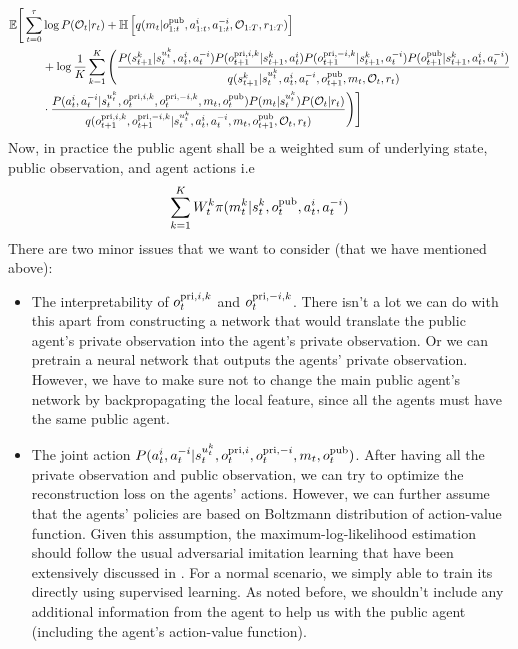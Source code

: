 \begin{equation}
\begin{aligned}
\label{eqn:chap5-elbo-public-agent}
    \mathbb{E}\Bigg[\sum^\tau_{t=0} &\log P(\mathcal{O}_t | r_t) + \mathbb{H}\left[ q(m_t | o^{\operatorname{pub}}_{1:t}, a^{i}_{1:t}, a^{-i}_{1:t}, \mathcal{O}_{1:T}, r_{1:T}) \right] \\
    &+ \log \frac{1}{K} \sum ^K_{k=1}\Bigg(\frac{P(s_{t+1}^k | s_t^{u^k_t}, a_t^i, a_t^{-i})P(o^{\operatorname{pri}, i, k}_{t+1} | s_{t+1}^k, a^i_t) P(o^{\operatorname{pri}, -i, k}_{t+1} | s_{t+1}^k, a^{-i}_t) P(o^{\operatorname{pub}}_{t+1} | s_{t+1}^k, a^i_t, a^{-i}_t)}{q(s_{t+1}^k | s_t^{u^k_t}, a^i_t, a^{-i}_t, o^{\operatorname{pub}}_{t+1}, m_t, \mathcal{O}_t, r_t)} \\
    &\cdot \frac{P(a^i_t, a^{-i}_t | s_t^{u^k_t}, o^{\operatorname{pri}, i, k}_t, o^{\operatorname{pri}, -i, k}_t, m_t, o^{\operatorname{pub}}_t) P(m_t | s_t^{u^k_t}) P(\mathcal{O}_t | r_t)}{q(o^{\operatorname{pri}, i, k}_{t+1}, o^{\operatorname{pri}, -i, k}_{t+1} | s_t^{u^k_t}, a^i_t, a^{-i}_t, m_t, o^{\operatorname{pub}}_{t+1}, \mathcal{O}_t, r_t)} \Bigg)\Bigg]
\end{aligned}
\end{equation}
Now, in practice the public agent shall be a weighted sum of underlying state, public observation, and agent actions i.e
\begin{equation}
    \sum^K_{k=1} W^k_t \pi(m^k_t | s^k_t, o^{\operatorname{pub}}_t, a^i_t, a^{-i}_t)
\end{equation}
There are two minor issues that we want to consider (that we have mentioned above):
\begin{itemize}
    \item The interpretability of $o^{\operatorname{pri}, i, k}_t$ and $o^{\operatorname{pri}, -i, k}_t$. There isn't a lot we can do with this apart from constructing a network that would translate the public agent's private observation into the agent's private observation. Or we can pretrain a neural network that outputs the agents' private observation. However, we have to make sure not to change the main public agent's network by backpropagating the local feature, since all the agents must have the same public agent.
    \item The joint action $P(a^i_t, a^{-i}_t | s_t^{u^k_t}, o^{\operatorname{pri}, i}_t, o^{\operatorname{pri}, -i}_t, m_t, o^{\operatorname{pub}}_t)$. After having all the private observation and public observation, we can try to optimize the reconstruction loss on the agents' actions. However, we can further assume that the agents' policies are based on Boltzmann distribution of action-value function. Given this assumption, the maximum-log-likelihood estimation should follow the usual adversarial imitation learning that have been extensively discussed in \cite{finn2016connection, yu2019multi}. For a normal scenario, we simply able to train its directly using supervised learning. As noted before, we shouldn't include any additional information from the agent to help us with the public agent (including the agent's action-value function). 
\end{itemize}
